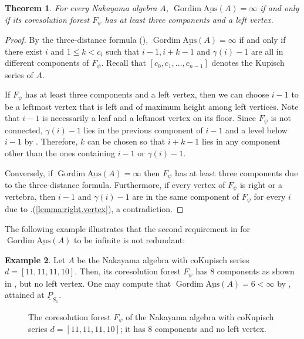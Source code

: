 \documentclass[a4paper]{amsart}
\newtheorem{theorem}{Theorem}[section]
\theoremstyle{definition}
\newtheorem{example}[theorem]{Example}
\theoremstyle{remark}
\numberwithin{equation}{theorem}
\newcommand{\sAus}{\operatorname{\underline{Aus}}}
\newcommand{\pstab}[1]{\underline{P}_{#1}}
\newcommand{\gordim}{\operatorname{Gordim}}
\newcommand{\kupisch}{\left[c_0, c_1,\dots, c_{n-1}\right]}
\newcommand{\psiforest}{F_\psi}
\begin{document}
\begin{theorem}
    \label{theo:three:components:left:vertex}
    For every Nakayama algebra $A$, $\gordim \sAus(A) = \infty$ if and only if its coresolution forest $\psiforest$ has at least three components and a left vertex.
\end{theorem}
\begin{proof}
      By the three-distance formula (), $\gordim \sAus (A) = \infty$ if and only if there exist $i$ and $1 \leq k < c_i$ such that $i-1, i + k -1$ and $ \gamma(i)-1 $ are all in different components of $\psiforest$.
      Recall that $\kupisch$ denotes the Kupisch series of $ A $.

    If $\psiforest$ has at least three components and a left vertex, then we can choose $ i-1 $ to be a leftmost vertex that is left and of maximum height among left vertices. Note that $i-1 $ is necessarily a leaf and a leftmost vertex on its floor. Since $ \psiforest $ is not connected, \mbox{$\gamma(i)-1$} lies in the previous component of $ i-1 $ and a level below $ i-1 $  by .
    Therefore, $k$ can be chosen so that $i + k - 1$ lies in any component other than the ones containing $ i-1 $ or $ \gamma(i)-1 $.

    Conversely, if $ \gordim \sAus(A) = \infty $ then $ \psiforest $ has at least three components due to the three-distance formula. Furthermore, if every vertex of $ \psiforest $ is right or a vertebra, then $ i-1 $ and $\gamma(i)-1 $ are in the same component of $ \psiforest $ for every $ i $ due to .(\ref{lemma:right.vertex}), a contradiction.
\end{proof}


The following example illustrates that the second requirement in  for $ \gordim \sAus(A) $ to be infinite is not redundant:
\begin{example}
    Let $A$ be the Nakayama algebra with coKupisch series $ d = [11,11, \allowbreak 11,10] $.
    Then, its coresolution forest $\psiforest$ has $8$ components as shown in , but no left vertex. One may compute that $\gordim \sAus(A) = 6 < \infty $ by , attained at $\pstab{S_1}$.
\end{example}
    \begin{figure}[t]
    \centering
    
    \caption{The coresolution forest $\psiforest$ of the Nakayama algebra with coKupisch series $ d=[11,11,11,10] $; it has $8$ components and no left vertex.}
    \label{fig:coresforest-11111110}
    \end{figure}
\end{document}

